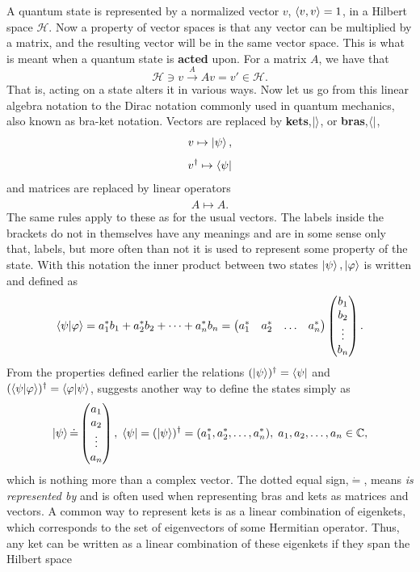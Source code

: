 A quantum state is represented by a normalized vector $v$, $\langle v,v \rangle = 1$, in a Hilbert space $\mathcal{H}$. Now a property of vector spaces is that any vector can be multiplied by a matrix, and the resulting vector will be in the same vector space. This is what is meant when a quantum state is \textbf{acted} upon. For a matrix $A$, we have that 
\begin{equation}
\mathcal{H} \ni v  \xrightarrow{A} Av = v' \in \mathcal{H}.
\end{equation}
That is, acting on a state alters it in various ways. Now let us go from this linear algebra notation to the Dirac notation commonly used in quantum mechanics, also known as bra-ket notation.
Vectors are replaced by \textbf{kets},$\ket{}$, or \textbf{bras},$\bra{}$, $$v \mapsto \ket{\psi},$$
$$v^\dagger \mapsto \bra{\psi}$$
and matrices are replaced by linear operators
$$A \mapsto \hat{A}.$$
The same rules apply to these as for the usual vectors.
The labels inside the brackets do not in themselves have any meanings and are in some sense only that, labels, but more often than not it is used to represent some property of the state. With this notation the inner product between two states $\ket{\psi},\ket{\varphi}$ is written and defined as
\begin{equation}
\bra{\psi}\ket{\varphi} = a_1^{*}b_1 + a_2^{*}b_2 + \dots + a_n^{*}b_n = \begin{pmatrix} a_1^{*} & a_2^{*} & \dots & a_n^{*}\end{pmatrix} \begin{pmatrix} b_1 \\ b_2 \\ \vdots \\ b_n\end{pmatrix}.
\end{equation}
From the properties defined earlier the relations $(\ket{\psi})^\dagger = \bra{\psi}$ and $ (\bra{\psi}\ket{\varphi})^\dagger = \bra{\varphi}\ket{\psi}$, suggests another way to define the states simply as
\begin{equation}
\ket{\psi} \dot{=} \begin{pmatrix}
a_1 \\ a_2 \\ \vdots \\ a_n
\end{pmatrix},\;
\bra{\psi} = (\ket{\psi})^{\dagger} = (a_1^{*}, a_2^{*}, \dots, a_n^{*}),\; a_1,a_2,\dots,a_n \in \mathbb{C},
\end{equation}
which is nothing more than a complex vector. The dotted equal sign,$\dot{=}$, means \textit{is represented by} and is often used when representing bras and kets as matrices and vectors. A common way to represent kets is as a linear combination of eigenkets, which corresponds to the set of eigenvectors of some Hermitian operator. Thus, any ket can be written as a linear combination of these eigenkets if they span the Hilbert space

